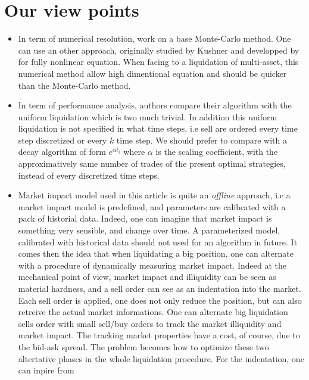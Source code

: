 \documentclass[a4paper,10pt]{article}
\begin{document}
\section{Our view points}
\begin{itemize}
 \item In term of numerical resolution, \cite{GMP} work on a base Monte-Carlo  method. One can use an other approach, originally studied by Kushner \cite{KUSH} and developped by \cite{DJ} for fully nonlinear equation. When facing to a liquidation of multi-asset, this numerical method allow high dimentional equation and should be quicker than the Monte-Carlo method. 
 \item In term of performance analysis, authors compare their algorithm with the uniform liquidation which is two much trivial. In addition this uniform liquidation is not specified in what time steps, i.e sell are ordered every time step discretized or every $k$ time step. We should prefer to compare with a decay algorithm of form $e^{\alpha t_i}$ where $\alpha$ is the scaling coefficient, with the approximatively same number of trades of the present optimal strategies, instead of every discretized time steps.
 \item Market impact model used in this article is quite an \textit{offline} approach, i.e a market impact model is predefined, and parameters are calibrated with a pack of historial data. Indeed, one can imagine that market impact is something very sensible, and change over time. A parameterized model, calibrated with historical data should not used for an algorithm in future. It comes then the idea that when liquidating a big position, one can alternate with a procedure of dynamically measuring market impact. Indeed at the mechanical point of view, market impact and illiquidity can be seen as material hardness, and a sell order can see as an indentation into the market. Each sell order is applied, one does not only reduce the position, but  can also retreive the actual market informations. One can alternate big liquidation sells order with small sell/buy orders to track the market illiquidity and market impact. The tracking market properties have a cost, of course, due to the bid-ask spread. The problem 
becomes how to optimize these two altertative phases in the whole liquidation procedure. For the indentation, one can inpire from \cite{BRIAN}       
\end{itemize}



\end{document}
